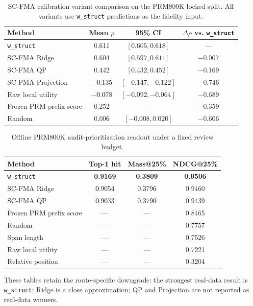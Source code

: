 \documentclass[a4paper,fleqn]{cas-sc}
\begin{document}
\begin{table}[ht]
\caption{SC-FMA calibration variant comparison on the PRM800K locked split. All variants use \texttt{w\_struct} predictions as the fidelity input.}
\label{tab:supp-scfma-variants}
\centering
\small
\begin{tabular}{lccc}
\toprule
\textbf{Method} & \textbf{Mean $\rho$} & \textbf{95\% CI} & \textbf{$\Delta\rho$ vs. \texttt{w\_struct}} \\
\midrule
\texttt{w\_struct} & 0.611 & $[0.605,0.618]$ & --- \\
SC-FMA Ridge & 0.604 & $[0.597,0.611]$ & $-$0.007 \\
SC-FMA QP & 0.442 & $[0.432,0.452]$ & $-$0.169 \\
SC-FMA Projection & $-$0.135 & $[-0.147,-0.122]$ & $-$0.746 \\
Raw local utility & $-$0.078 & $[-0.092,-0.064]$ & $-$0.689 \\
Frozen PRM prefix score & 0.252 & --- & $-$0.359 \\
Random & 0.006 & $[-0.008,0.020]$ & $-$0.606 \\
\bottomrule
\end{tabular}
\end{table}

\begin{table}[ht]
\caption{Offline PRM800K audit-prioritization readout under a fixed review budget.}
\label{tab:supp-audit-prioritization}
\centering
\small
\begin{tabular}{lccc}
\toprule
\textbf{Method} & \textbf{Top-1 hit} & \textbf{Mass@25\%} & \textbf{NDCG@25\%} \\
\midrule
\texttt{w\_struct} & \textbf{0.9169} & \textbf{0.3809} & \textbf{0.9506} \\
SC-FMA Ridge & 0.9054 & 0.3796 & 0.9460 \\
SC-FMA QP & 0.9033 & 0.3790 & 0.9439 \\
Frozen PRM prefix score & --- & --- & 0.8465 \\
Random & --- & --- & 0.7757 \\
Span length & --- & --- & 0.7526 \\
Raw local utility & --- & --- & 0.7221 \\
Relative position & --- & --- & 0.3204 \\
\bottomrule
\end{tabular}
\end{table}

These tables retain the route-specific downgrade: the strongest real-data result is \texttt{w\_struct}; Ridge is a close approximation; QP and Projection are not reported as real-data winners.
\end{document}
